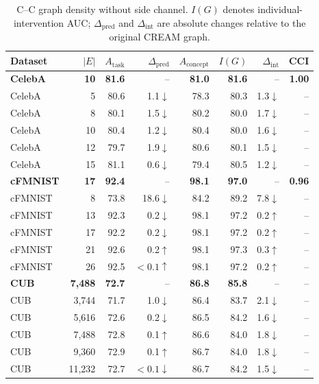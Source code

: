 \begin{table}[t]
\centering
\caption{C--C graph density without side channel. $I(G)$ denotes individual-intervention AUC; $\Delta_{\mathrm{pred}}$ and $\Delta_{\mathrm{int}}$ are absolute changes relative to the original CREAM graph.}
\label{tab:cc_density_no_side}
\small
\setlength{\tabcolsep}{6pt}
\begin{tabular}{lrrrrrrr}
\toprule
Dataset & $|E|$ & $A_{\mathrm{task}}$ & $\Delta_{\mathrm{pred}}$ & $A_{\mathrm{concept}}$ & $I(G)$ & $\Delta_{\mathrm{int}}$ & CCI \\
\midrule
\rowcolor{gray!15}
\textbf{CelebA} & \textbf{10} & \textbf{81.6} & -- & \textbf{81.0} & \textbf{81.6} & -- & \textbf{1.00} \\
CelebA & 5 & 80.6 & 1.1$\downarrow$ & 78.3 & 80.3 & 1.3$\downarrow$ & -- \\
CelebA & 8 & 80.1 & 1.5$\downarrow$ & 80.2 & 80.0 & 1.7$\downarrow$ & -- \\
CelebA & 10 & 80.4 & 1.2$\downarrow$ & 80.4 & 80.0 & 1.6$\downarrow$ & -- \\
CelebA & 12 & 79.7 & 1.9$\downarrow$ & 80.6 & 80.1 & 1.5$\downarrow$ & -- \\
CelebA & 15 & 81.1 & 0.6$\downarrow$ & 79.4 & 80.5 & 1.2$\downarrow$ & -- \\
\midrule
\rowcolor{gray!15}
\textbf{cFMNIST} & \textbf{17} & \textbf{92.4} & -- & \textbf{98.1} & \textbf{97.0} & -- & \textbf{0.96} \\
cFMNIST & 8 & 73.8 & 18.6$\downarrow$ & 84.2 & 89.2 & 7.8$\downarrow$ & -- \\
cFMNIST & 13 & 92.3 & 0.2$\downarrow$ & 98.1 & 97.2 & 0.2$\uparrow$ & -- \\
cFMNIST & 17 & 92.2 & 0.2$\downarrow$ & 98.1 & 97.2 & 0.2$\uparrow$ & -- \\
cFMNIST & 21 & 92.6 & 0.2$\uparrow$ & 98.1 & 97.3 & 0.3$\uparrow$ & -- \\
cFMNIST & 26 & 92.5 & $<0.1\uparrow$ & 98.1 & 97.2 & 0.2$\uparrow$ & -- \\
\midrule
\rowcolor{gray!15}
\textbf{CUB} & \textbf{7,488} & \textbf{72.7} & -- & \textbf{86.8} & \textbf{85.8} & -- & -- \\
CUB & 3,744 & 71.7 & 1.0$\downarrow$ & 86.4 & 83.7 & 2.1$\downarrow$ & -- \\
CUB & 5,616 & 72.6 & 0.2$\downarrow$ & 86.5 & 84.2 & 1.6$\downarrow$ & -- \\
CUB & 7,488 & 72.8 & 0.1$\uparrow$ & 86.6 & 84.0 & 1.8$\downarrow$ & -- \\
CUB & 9,360 & 72.9 & 0.1$\uparrow$ & 86.7 & 84.0 & 1.8$\downarrow$ & -- \\
CUB & 11,232 & 72.7 & $<0.1\downarrow$ & 86.7 & 84.2 & 1.5$\downarrow$ & -- \\
\bottomrule
\end{tabular}
\end{table}
